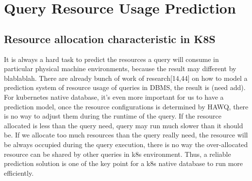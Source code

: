 \section{Query Resource Usage Prediction}
\subsection{Resource allocation characteristic in K8S}
It is always a hard task to predict the resources a query will consume in particular physical machine environments, because the result may different by blablablah.  There are already bunch of work of research[14,44] on how to model a prediction system of resource usage of queries in DBMS, the result is (need add). For  kubernetes native database, it's even more important for us to have a prediction model, once the resource configurations is determined by HAWQ, there is no way to adjust them during the runtime of the query. If the resource allocated is less than the query need, query may run much slower than it should be. If we allocate too much resources than the query really need, the resource will be always occupied during the query execution, there is no way the over-allocated resource can be shared by other queries in k8s environment. Thus, a reliable prediction solution is one of the key point for a k8s native database to run more efficiently.
